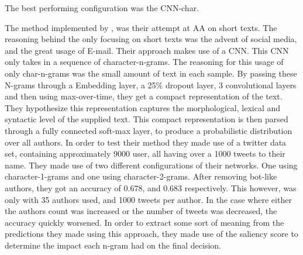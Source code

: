 The best performing configuration was the CNN-char.

The method implemented by \cite{shrestha2017}, was their attempt at \gls{AA}
on short texts. The reasoning behind the only focusing on short texts was the
advent of social media, and the great usage of E-mail. Their approach makes use
of a \gls{CNN}. This \gls{CNN} only takes in a sequence of character-n-grams.
The reasoning for this usage of only char-n-grams was the small amount of text
in each sample. By passing these N-grams through a Embedding layer, a 25\%
dropout layer, 3 convolutional layers and then using max-over-time, they get
a compact representation of the text. They hypothesize this representation
captures the morphological, lexical and syntactic level of the supplied text.
This compact representation is then parsed through a fully connected soft-max
layer, to produce a probabilistic distribution over all authors. In order to
test their method they made use of a twitter data set, containing approximately
9000 user, all having over a 1000 tweets to their name. They made use of two
different configurations of their networks. One using character-1-grams and one
using character-2-grams. After removing bot-like authors, they got an accuracy
of 0.678, and 0.683 respectively. This however, was only with 35 authors used,
and 1000 tweets per author. In the case where either the authors count was
increased or the number of tweets was decreased, the accuracy quickly worsened.
In order to extract some sort of meaning from the predictions they made using
this approach, they made use of the saliency score to determine the impact each
n-gram had on the final decision.

